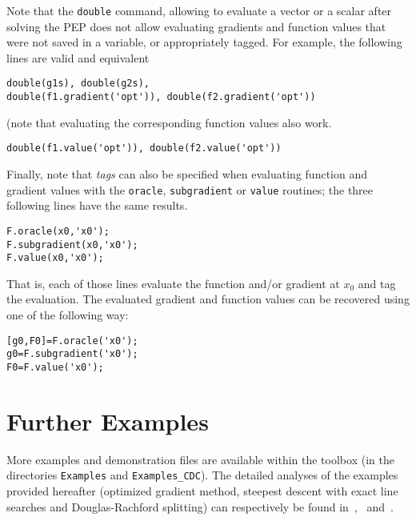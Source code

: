 \documentclass[11pt,a4paper]{article}
\begin{document}
Note that the \verb?double? command, allowing to evaluate a vector or a scalar after solving the PEP does not allow evaluating gradients and function values that were not saved in a variable, or appropriately tagged. For example, the following lines are valid and equivalent\\[-1cm]
\begin{lstlisting}
double(g1s), double(g2s),
double(f1.gradient('opt')), double(f2.gradient('opt'))
\end{lstlisting}
(note that evaluating the corresponding function values also work.\\[-1cm]
\begin{lstlisting}
double(f1.value('opt')), double(f2.value('opt'))
\end{lstlisting}
Finally, note that \emph{tags} can also be specified when evaluating function and gradient values with the \verb?oracle?, \verb?subgradient? or \verb?value? routines; the three following lines have the same results.\\[-1cm]
\begin{lstlisting}
F.oracle(x0,'x0');
F.subgradient(x0,'x0');
F.value(x0,'x0');
\end{lstlisting}
That is, each of those lines evaluate the function and/or gradient at $x_0$ and tag the evaluation. The evaluated gradient and function values can be recovered using one of the  following way:\\[-1cm]
\begin{lstlisting}
[g0,F0]=F.oracle('x0');
g0=F.subgradient('x0');
F0=F.value('x0');
\end{lstlisting}
\section{Further Examples}		%
More examples and demonstration files are available within the toolbox (in the directories \verb?Examples? and \verb?Examples_CDC?). The detailed analyses of the examples provided hereafter (optimized gradient method, steepest descent with exact line searches and Douglas-Rachford splitting) can respectively be found in~\cite{Article:Drori,kim2014optimized,kim2015convergence},~\cite{deKlerkELS2016} and~\cite{giselsson2016linear}.
\newpage
\end{document}
